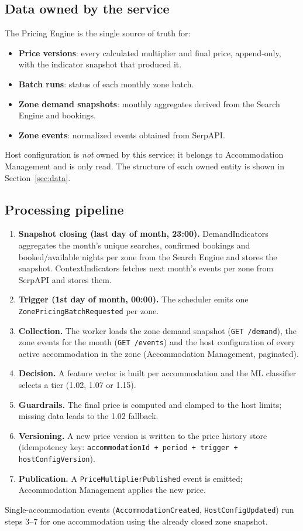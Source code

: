 \documentclass[11pt,a4paper]{article}
\begin{document}
\subsection{Data owned by the service}
The Pricing Engine is the single source of truth for:
\begin{itemize}
  \item \textbf{Price versions}: every calculated multiplier and final price,
    append-only, with the indicator snapshot that produced it.
  \item \textbf{Batch runs}: status of each monthly zone batch.
  \item \textbf{Zone demand snapshots}: monthly aggregates derived from the
    Search Engine and bookings.
  \item \textbf{Zone events}: normalized events obtained from SerpAPI.
\end{itemize}
Host configuration is \emph{not} owned by this service; it belongs to
Accommodation Management and is only read. The structure of each owned
entity is shown in Section~\ref{sec:data}.

\subsection{Processing pipeline}
\begin{enumerate}
  \item \textbf{Snapshot closing (last day of month, 23:00).} DemandIndicators
    aggregates the month's unique searches, confirmed bookings and
    booked/available nights per zone from the Search Engine and stores the
    snapshot. ContextIndicators fetches next month's events per zone from
    SerpAPI and stores them.
  \item \textbf{Trigger (1st day of month, 00:00).} The scheduler emits one
    \texttt{ZonePricingBatchRequested} per zone.
  \item \textbf{Collection.} The worker loads the zone demand snapshot
    (\texttt{GET /demand}), the zone events for the month
    (\texttt{GET /events}) and the host configuration of every active
    accommodation in the zone (Accommodation Management, paginated).
  \item \textbf{Decision.} A feature vector is built per accommodation and
    the ML classifier selects a tier (1.02, 1.07 or 1.15).
  \item \textbf{Guardrails.} The final price is computed and clamped to the
    host limits; missing data leads to the 1.02 fallback.
  \item \textbf{Versioning.} A new price version is written to the price
    history store (idempotency key: \texttt{accommodationId + period + trigger + hostConfigVersion}).
  \item \textbf{Publication.} A \texttt{PriceMultiplierPublished} event is
    emitted; Accommodation Management applies the new price.
\end{enumerate}
Single-accommodation events (\texttt{AccommodationCreated},
\texttt{HostConfigUpdated}) run steps 3--7 for one accommodation using the
already closed zone snapshot.
\end{document}

